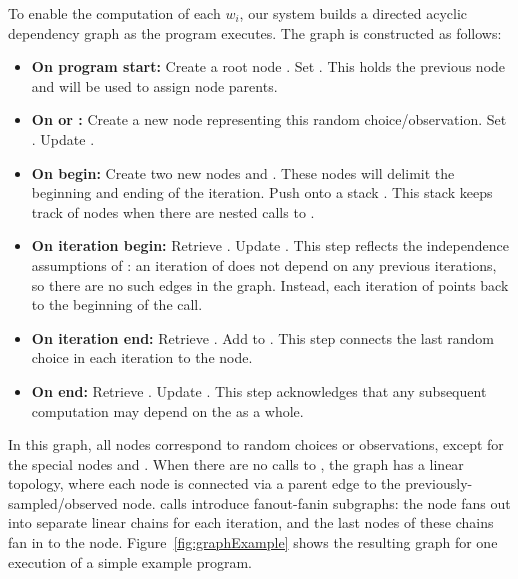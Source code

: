 To enable the computation of each $w_i$, our system builds a directed acyclic dependency graph as the program executes. The graph is constructed as follows:
\begin{itemize}
\item{\textbf{On program start:} Create a root node . Set . This holds the previous node and will be used to assign node parents.}
\item{\textbf{On  or :} Create a new node  representing this random choice/observation. Set . Update .}
\item{\textbf{On  begin:} Create two new nodes  and . These nodes will delimit the beginning and ending of the  iteration. Push  onto a stack . This stack keeps track of  nodes when there are nested calls to .}
\item{\textbf{On  iteration begin:} Retrieve . Update . This step reflects the independence assumptions of : an iteration of  does not depend on any previous iterations, so there are no such edges in the graph. Instead, each iteration of  points back to the beginning of the  call.}
\item{\textbf{On  iteration end:} Retrieve . Add  to . This step connects the last random choice in each  iteration to the  node.}
\item{\textbf{On  end:} Retrieve . Update . This step acknowledges that any subsequent computation may depend on the  as a whole.}
\end{itemize}
In this graph, all nodes correspond to random choices or observations, except for the special  nodes  and .
When there are no calls to , the graph has a linear topology, where each node is connected via a parent edge to the previously-sampled/observed node.
 calls introduce fanout-fanin subgraphs: the  node fans out into separate linear chains for each  iteration, and the last nodes of these chains fan in to the  node. Figure~\ref{fig:graphExample} shows the resulting graph for one execution of a simple example program.

